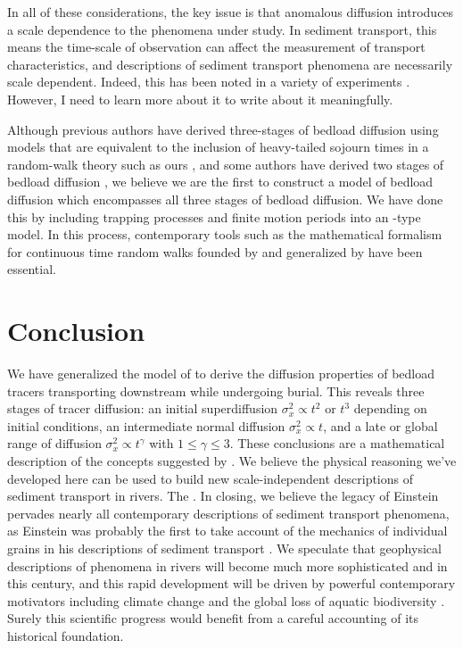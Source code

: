 \documentclass[]{agujournal2018}
\begin{document}
In all of these considerations, the key issue is that anomalous diffusion introduces a scale dependence to the phenomena under study.
In sediment transport, this means the time-scale of observation can affect the measurement of transport characteristics, and descriptions of sediment transport phenomena are necessarily scale dependent.
Indeed, this has been noted in a variety of experiments \citep{Singh2009,Saletti2015,Campagnol2012}.
However, I need to learn more about it to write about it meaningfully.

Although previous authors have derived three-stages of bedload diffusion using models that are equivalent to the inclusion of heavy-tailed sojourn times in a random-walk theory such as ours \citep[e.g.][]{Zhang2012}, and some authors have derived two stages of bedload diffusion \citep[e.g.][]{Wu2019}, we believe we are the first to construct a model of bedload diffusion which encompasses all three stages of bedload diffusion.
We have done this by including trapping processes and finite motion periods into an \citet{Einstein1937}-type model.
In this process, contemporary tools such as the mathematical formalism for continuous time random walks founded by \citet{Montroll1965} and generalized by \citet{Weiss1976} have been essential.


\section{Conclusion}
We have generalized the model of \citet{Einstein1937} to derive the diffusion properties of bedload tracers transporting downstream while undergoing burial.
This reveals three stages of tracer diffusion: an initial superdiffusion $\sigma_x^2 \propto t^2$ or $t^3$ depending on initial conditions, an intermediate normal diffusion $\sigma_x^2 \propto t$, and a late or global range of diffusion $\sigma_x^2 \propto t^\gamma$ with $1\leq \gamma \leq 3$.
These conclusions are a mathematical description of the concepts suggested by \citet{Nikora2001a,Nikora2002}. 
We believe the physical reasoning we've developed here can be used to build new scale-independent descriptions of sediment transport in rivers.
The .
In closing, we believe the legacy of Einstein pervades nearly all contemporary descriptions of sediment transport phenomena, as Einstein was probably the first to take account of the mechanics of individual grains in his descriptions of sediment transport \citep{Einstein1937,Einstein1942,Einstein1950}.
We speculate that geophysical descriptions of phenomena in rivers will become much more sophisticated and  in this century, and this rapid development will be driven by powerful contemporary motivators including climate change \citep{Phillips2016} and the global loss of aquatic biodiversity \citep{Hauer2016}.
Surely this scientific progress would benefit from a careful accounting of its historical foundation.
\end{document}
